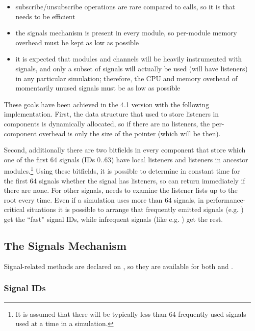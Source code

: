 \begin{ned}
\begin{itemize}
  \item subscribe/unsubscribe operations are rare compared to 
    calls, so it is  that needs to be efficient
  \item the signals mechanism is present in every module, so per-module
    memory overhead must be kept as low as possible
  \item it is expected that modules and channels will be heavily instrumented
    with signals, and only a subset of signals will actually be used
    (will have listeners) in any particular simulation; therefore,
    the CPU and memory overhead of momentarily unused signals must be
    as low as possible
\end{itemize}

These goals have been achieved in the 4.1 version with the following
implementation. First, the data structure that used to store listeners in
components is dynamically allocated, so if there are no listeners, the
per-component overhead is only the size of the pointer (which will be
 then).

Second, additionally there are two bitfields in every component that store
which one of the first 64 signals (IDs 0..63) have local listeners and
listeners in ancestor modules.\footnote{It is assumed that there will be
typically less than 64 frequently used signals used at a time in a
simulation.} Using these bitfields, it is possible to determine in constant
time for the first 64 signals whether the signal has listeners, so
 can return immediately if there are none. For other signals,
 needs to examine the listener lists up to the root every
time. Even if a simulation uses more than 64 signals, in
performance-critical situations it is possible to arrange that frequently
emitted signals (e.g. ) get the ``fast'' signal IDs, while
infrequent signals (like e.g. ) get the rest.


\subsection{The Signals Mechanism}
\label{sec:simple-modules:signals-api}

Signal-related methods are declared on , so they are available
for both  and .

\subsubsection{Signal IDs}
\label{sec:simple-modules:signal-ids}


\end{ned}
